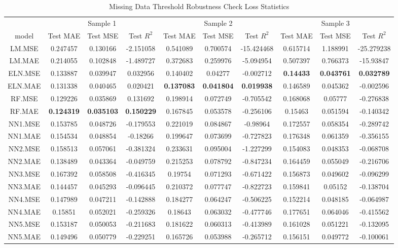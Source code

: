 \begin{table}

\caption{\label{tab:}Missing Data Threshold Robustness Check Loss Statistics}
\centering
\fontsize{6}{8}\selectfont
\begin{tabular}[t]{cccccccccc}
\toprule
\multicolumn{1}{c}{ } & \multicolumn{3}{c}{Sample 1} & \multicolumn{3}{c}{Sample 2} & \multicolumn{3}{c}{Sample 3} \\
\cmidrule(l{3pt}r{3pt}){2-4} \cmidrule(l{3pt}r{3pt}){5-7} \cmidrule(l{3pt}r{3pt}){8-10}
model & Test MAE & Test MSE & Test $R^2$ & Test MAE & Test MSE & Test $R^2$ & Test MAE & Test MSE & Test $R^2$\\
\midrule
LM.MSE & 0.247457 & 0.130166 & -2.151058 & 0.541089 & 0.700574 & -15.424468 & 0.615714 & 1.188991 & -25.279238\\
LM.MAE & 0.214055 & 0.102848 & -1.489727 & 0.372683 & 0.259976 & -5.094954 & 0.507397 & 0.766373 & -15.93847\\
ELN.MSE & 0.133887 & 0.039947 & 0.032956 & 0.140402 & 0.04277 & -0.002712 & \textbf{0.14433} & \textbf{0.043761} & \textbf{0.032789}\\
ELN.MAE & 0.131338 & 0.040465 & 0.020421 & \textbf{0.137083} & \textbf{0.041804} & \textbf{0.019938} & 0.146589 & 0.045362 & -0.002596\\
RF.MSE & 0.129226 & 0.035869 & 0.131692 & 0.198914 & 0.072749 & -0.705542 & 0.168068 & 0.05777 & -0.276838\\
RF.MAE & \textbf{0.124319} & \textbf{0.035103} & \textbf{0.150229} & 0.167845 & 0.053578 & -0.256106 & 0.15463 & 0.051594 & -0.140342\\
NN1.MSE & 0.153785 & 0.048726 & -0.179553 & 0.221019 & 0.084867 & -0.98964 & 0.172557 & 0.058354 & -0.289742\\
NN1.MAE & 0.154534 & 0.048854 & -0.18266 & 0.199647 & 0.073699 & -0.727823 & 0.176348 & 0.061359 & -0.356155\\
NN2.MSE & 0.158513 & 0.057061 & -0.381324 & 0.233631 & 0.095004 & -1.227299 & 0.154083 & 0.048353 & -0.068708\\
NN2.MAE & 0.138489 & 0.043364 & -0.049759 & 0.215253 & 0.078792 & -0.847234 & 0.164459 & 0.055049 & -0.216706\\
NN3.MSE & 0.167392 & 0.058508 & -0.416345 & 0.19754 & 0.071293 & -0.671422 & 0.156873 & 0.049602 & -0.096299\\
NN3.MAE & 0.144457 & 0.045293 & -0.096445 & 0.210372 & 0.077747 & -0.822723 & 0.159841 & 0.05152 & -0.138704\\
NN4.MSE & 0.147989 & 0.047211 & -0.142888 & 0.184277 & 0.064247 & -0.506225 & 0.152214 & 0.048185 & -0.064987\\
NN4.MAE & 0.15851 & 0.052021 & -0.259326 & 0.18643 & 0.063032 & -0.477746 & 0.177651 & 0.064046 & -0.415562\\
NN5.MSE & 0.153187 & 0.050053 & -0.211683 & 0.181622 & 0.060313 & -0.413989 & 0.161028 & 0.051221 & -0.132095\\
NN5.MAE & 0.149496 & 0.050779 & -0.229251 & 0.165726 & 0.053988 & -0.265712 & 0.156151 & 0.049772 & -0.100061\\
\bottomrule
\end{tabular}
\end{table}